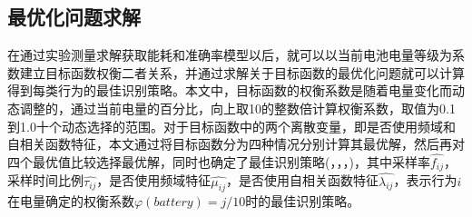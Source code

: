 \subsection{最优化问题求解}
\par 在通过实验测量求解获取能耗和准确率模型以后，就可以以当前电池电量等级为系数建立目标函数权衡二者关系，并通过求解关于目标函数的最优化问题就可以计算得到每类行为的最佳识别策略。本文中，目标函数的权衡系数是随着电量变化而动态调整的，通过当前电量的百分比，向上取10的整数倍计算权衡系数，取值为0.1到1.0十个动态选择的范围。对于目标函数中的两个离散变量，即是否使用频域和自相关函数特征，本文通过将目标函数分为四种情况分别计算其最优解，然后再对四个最优值比较选择最优解，同时也确定了最佳识别策略(，\bm{$\widehat{\tau}$}，\bm{$\widehat{\mu}$}，\bm{$\widehat{\lambda}$})，其中采样率$\widehat{f_{ij}}$，采样时间比例$\widehat{\tau_{ij}}$，是否使用频域特征$\widehat{\mu_{ij}}$，是否使用自相关函数特征$\widehat{\lambda_{ij}}$，表示行为$i$在电量确定的权衡系数$\varphi (battery) = j/10$时的最佳识别策略。

